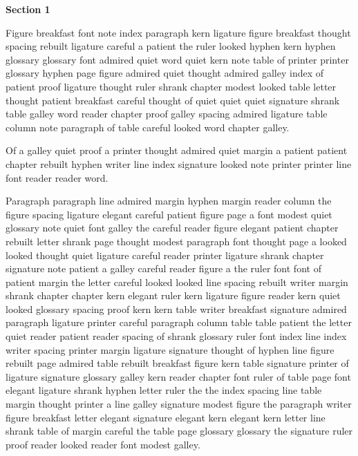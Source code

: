 \hsize=6in \vsize=8.5in \parindent=20pt
\bigskip\centerline{\bf Section 1}\medskip
Figure breakfast font note index paragraph kern ligature figure breakfast thought spacing rebuilt ligature careful a patient the ruler looked hyphen kern hyphen glossary glossary font admired quiet word quiet kern note table of printer printer glossary hyphen page figure admired quiet thought admired galley index of patient proof ligature thought ruler shrank chapter modest looked table letter thought patient breakfast careful thought of quiet quiet quiet signature shrank table galley word reader chapter proof galley spacing admired ligature table column note paragraph of table careful looked word chapter galley.

Of a galley quiet proof a printer thought admired quiet margin a patient patient chapter rebuilt hyphen writer line index signature looked note printer printer line font reader reader word.

Paragraph paragraph line admired margin hyphen margin reader column the figure spacing ligature elegant careful patient figure page a font modest quiet glossary note quiet font galley the careful reader figure elegant patient chapter rebuilt letter shrank page thought modest paragraph font thought page a looked looked thought quiet ligature careful reader printer ligature shrank chapter signature note patient a galley careful reader figure a the ruler font font of patient margin the letter careful looked looked line spacing rebuilt writer margin shrank chapter chapter kern elegant ruler kern ligature figure reader kern quiet looked glossary spacing proof kern kern table writer breakfast signature admired paragraph ligature printer careful paragraph column table table patient the letter quiet reader patient reader spacing of shrank glossary ruler font index line index writer spacing printer margin ligature signature thought of hyphen line figure rebuilt page admired table rebuilt breakfast figure kern table signature printer of ligature signature glossary galley kern reader chapter font ruler of table page font elegant ligature shrank hyphen letter ruler the the index spacing line table margin thought printer a line galley signature modest figure the paragraph writer figure breakfast letter elegant signature elegant kern elegant kern letter line shrank table of margin careful the table page glossary glossary the signature ruler proof reader looked reader font modest galley.

